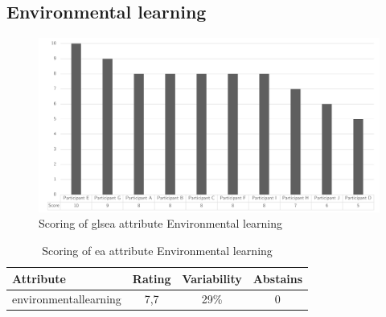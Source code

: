 \subsection{Environmental learning}
\begin{figure}[H]
	\centering
	\includegraphics[width=0.9\linewidth]{images/scoreeaenvironmentallearning}
	\caption[Scoring of \gls{ea} attribute Environmental learning]{Scoring of gls{ea} attribute Environmental learning}
	\label{fig:appscoringeaenvironmentallearning}
\end{figure}
\begin{table}[H]
	\centering
	\begin{tabular}{p{}ccc}
		\toprule
		\textbf{Attribute} & \textbf{Rating} & \textbf{Variability} & \textbf{Abstains} \\
		\midrule
		\Gls{environmentallearning} & 7,7 & 29\% & 0 \\%
		\bottomrule
	\end{tabular}%
	\caption[Scoring of \gls{ea} attribute Environmental learning]{Scoring of \gls{ea} attribute Environmental learning}
	\label{tab:appscoringeaenvironmentallearning}%
\end{table}%
\newpage

